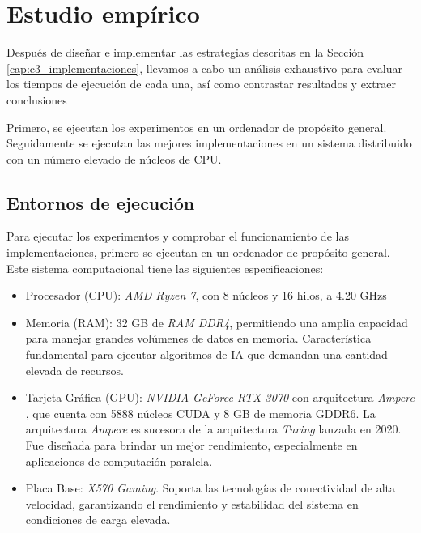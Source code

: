 


\chapter{Estudio empírico}
\label{cap:c4_estudio}	
Después de diseñar e implementar las estrategias descritas en la Sección \ref{cap:c3_implementaciones}, llevamos a cabo un análisis exhaustivo para evaluar los tiempos de ejecución de cada una, así como contrastar resultados y extraer conclusiones

Primero, se ejecutan los experimentos en un ordenador de propósito general. Seguidamente se ejecutan las mejores implementaciones en un sistema distribuido con un número elevado de núcleos de CPU. 

\section{Entornos de ejecución}

Para ejecutar los experimentos y comprobar el funcionamiento de las implementaciones, primero se ejecutan en un ordenador de propósito general. Este sistema computacional tiene las siguientes especificaciones:

\begin{itemize}
	\item Procesador (CPU): \textit{AMD Ryzen 7}, con 8 núcleos y 16 hilos, a 4.20 GHzs
	\item Memoria (RAM): 32 GB de \textit{RAM DDR4}, permitiendo una amplia capacidad para manejar grandes volúmenes de datos en memoria. Característica fundamental para ejecutar algoritmos de IA que demandan una cantidad elevada de recursos.
	\item Tarjeta Gráfica (GPU): \textit{NVIDIA GeForce RTX 3070} con arquitectura \textit{Ampere} \cite{pool2020accelerating}, que cuenta con 5888 núcleos CUDA y 8 GB de memoria GDDR6. La arquitectura \textit{Ampere} es sucesora de la arquitectura \textit{Turing} lanzada en 2020. Fue diseñada para brindar un mejor rendimiento, especialmente en aplicaciones de computación paralela.
	\item Placa Base: \textit{X570 Gaming}. Soporta las tecnologías de conectividad de alta velocidad, garantizando el rendimiento y estabilidad del sistema en condiciones de carga elevada.
\end{itemize}

